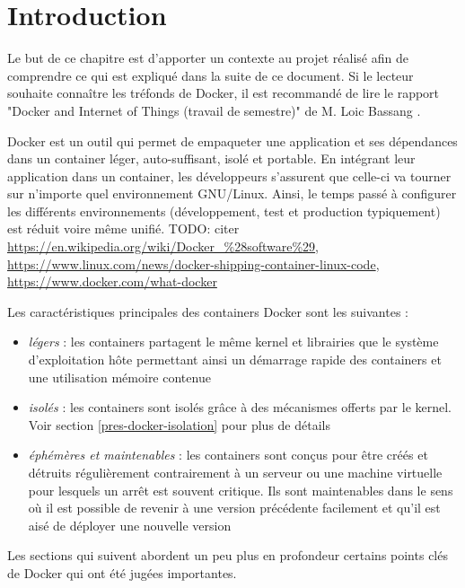 \newcommand{\bassangPrjSemestre}{Docker and Internet of Things (travail de semestre)}
\newcommand{\bassangPrjBachelor}{Docker and Internet of Things (travail de Bachelor)}
\section{Introduction}

Le but de ce chapitre est d'apporter un contexte au projet réalisé afin de comprendre ce qui est expliqué dans la suite de ce document. Si le lecteur souhaite connaître les tréfonds de Docker, il est recommandé de lire le rapport "\bassangPrjSemestre" de M. Loic Bassang \cite{TODO}. 

Docker est un outil qui permet de empaqueter une application et ses dépendances dans un container léger, auto-suffisant, isolé et portable. En intégrant leur application dans un container, les développeurs s'assurent que celle-ci va tourner sur n'importe quel environnement GNU/Linux. Ainsi, le temps passé à configurer les différents environnements (développement, test et production typiquement) est réduit voire même unifié.
TODO: citer \url{https://en.wikipedia.org/wiki/Docker_%28software%29}, \url{https://www.linux.com/news/docker-shipping-container-linux-code}, \url{https://www.docker.com/what-docker}

Les caractéristiques principales des containers Docker sont les suivantes :
\begin{itemize}
\item \textit{légers} : les containers partagent le même kernel et librairies que le système d'exploitation hôte permettant ainsi un démarrage rapide des containers et une utilisation mémoire contenue
\item \textit{isolés} : les containers sont isolés grâce à des mécanismes offerts par le kernel. Voir section \ref{pres-docker-isolation} pour plus de détails
\item \textit{éphémères et maintenables} : les containers sont conçus pour être créés et détruits régulièrement contrairement à un serveur ou une machine virtuelle pour lesquels un arrêt est souvent critique. Ils sont maintenables dans le sens où il est possible de revenir à une version précédente facilement et qu'il est aisé de déployer une nouvelle version
\end{itemize}

Les sections qui suivent abordent un peu plus en profondeur certains points clés de Docker qui ont été jugées importantes.

